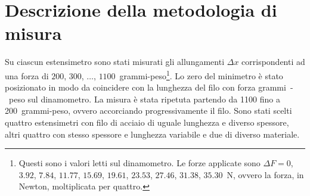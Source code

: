 \documentclass[italian,a4paper]{article}
\begin{document}
\section{Descrizione della metodologia di misura}
Su ciascun estensimetro sono stati misurati gli allungamenti $\Delta x$ corrispondenti ad una forza di $200$, $300$, $\dots$, $1100$~grammi-peso\footnote{Questi sono i valori letti sul dinamometro. Le forze applicate sono $\Delta F=0$, $3.92$, $7.84$, $11.77$, $15.69$, $19.61$, $23.53$, $27.46$, $31.38$, $35.30$~\unit{N}, ovvero la forza, in Newton, moltiplicata per quattro.}. Lo zero del minimetro è stato posizionato in modo da coincidere con la lunghezza del filo con forza \unit[200]{grammi-peso} sul dinamometro. La misura è stata ripetuta partendo da 1100 fino a 200~grammi-peso, ovvero accorciando progressivamente il filo. Sono stati scelti quattro estensimetri con filo di acciaio di uguale lunghezza e diverso spessore, altri quattro con stesso spessore e lunghezza variabile e due di diverso materiale.
\end{document}
